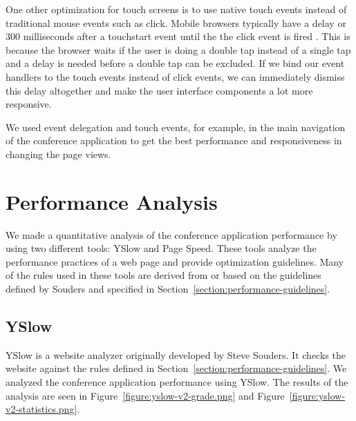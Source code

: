 One other optimization for touch screens is to use native touch events
instead of traditional mouse events such as click. Mobile browsers
typically have a delay or 300 milliseconds after a touchstart event
until the the click event is fired \citationneeded. This is because
the browser waits if the user is doing a double tap instead of a
single tap and a delay is needed before a double tap can be
excluded. If we bind our event handlers to the touch events instead of
click events, we can immediately dismiss this delay altogether and
make the user interface components a lot more responsive.

We used event delegation and touch events, for example, in the main
navigation of the conference application to get the best performance
and responsiveness in changing the page views.

\section{Performance Analysis}
\label{section:performance-analysis}

We made a quantitative analysis of the conference application
performance by using two different tools: YSlow and Page Speed. These
tools analyze the performance practices of a web page and provide
optimization guidelines. Many of the rules used in these tools are
derived from or based on the guidelines defined by Souders
\cite{souders2007high, souders2009even} and specified in
Section~\ref{section:performance-guidelines}.

\subsection{YSlow}

YSlow is a website analyzer originally developed by Steve Souders. It
checks the website against the rules defined in
Section~\ref{section:performance-guidelines}. We analyzed the
conference application performance using YSlow. The results of the
analysis are seen in Figure~\ref{figure:yslow-v2-grade.png} and
Figure~\ref{figure:yslow-v2-statistics.png}.

